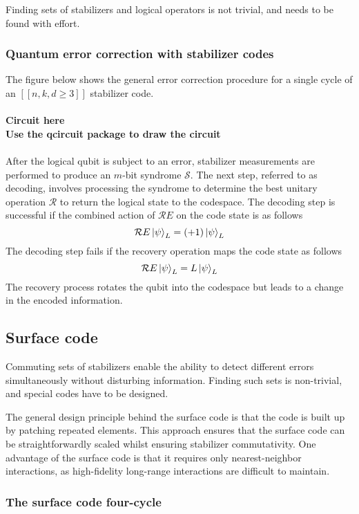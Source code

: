 \documentclass[final,5p,times,twocolumn,authoryear]{elsarticle}
\begin{document}
Finding sets of stabilizers and logical operators is not trivial, and needs to be found with effort.

\subsubsection{Quantum error correction with stabilizer codes}

The figure below shows the general error correction procedure for a single cycle of an $[[n,k,d \geq 3]]$ stabilizer code.
\\
\\
\textbf{Circuit here}
\\
\textbf{Use the qcircuit package to draw the circuit}
\\
\\
After the logical qubit is subject to an error, stabilizer measurements are performed to produce an $m$-bit syndrome $\mathcal{S}$. The next step, referred to as decoding, involves processing the syndrome to determine the best unitary operation $\mathcal{R}$ to return the logical state to the codespace. The decoding step is successful if the combined action of $\mathcal{R}E$ on the code state is as follows
\[
    \mathcal{R}E \ket{\psi}_L = (+1) \ket{\psi}_L
\]
The decoding step fails if the recovery operation maps the code state as follows
\[
    \mathcal{R}E \ket{\psi}_L = L \ket{\psi}_L
\]
The recovery process rotates the qubit into the codespace but leads to a change in the encoded information.

\subsection{Surface code}

Commuting sets of stabilizers enable the ability to detect different errors simultaneously without disturbing information. Finding such sets is non-trivial, and special codes have to be designed.

The general design principle behind the surface code is that the code is built up by patching repeated elements. This approach ensures that the surface code can be straightforwardly scaled whilst ensuring stabilizer commutativity. One advantage of the surface code is that it requires only nearest-neighbor interactions, as high-fidelity long-range interactions are difficult to maintain.

\subsubsection{The surface code four-cycle}
\end{document}
